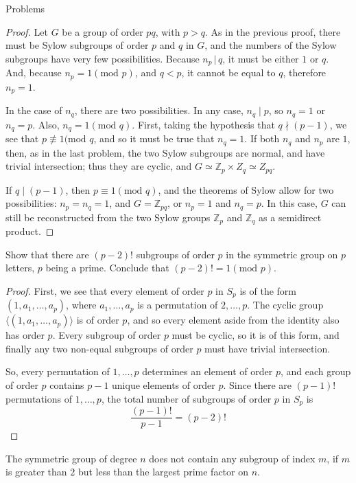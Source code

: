 \documentclass[12pt]{article}
\newcommand{\Z}{\mathbb{Z}}
\theoremstyle{definition}
\newenvironment{problem}[2][Problem]{\begin{trivlist}
\item[\hskip \labelsep {\bfseries #1}\hskip \labelsep {\bfseries #2.}]}{\end{trivlist}}
\begin{document}
\begin{section}{Problems}
\begin{problem}{5}
\begin{proof}
		Let $G$ be a group of order $pq$, with $p > q$. As in the previous proof, there must be Sylow subgroups of order $p$ and $q$ in $G$, and the numbers of the Sylow subgroups have very few possibilities. Because $n_p \,\lvert\, q$, it must be either $1$ or $q$. And, because $n_p = 1 (\text{mod }p)$, and $q < p$, it cannot be equal to $q$, therefore $n_p = 1$. 
		\par In the case of $n_q$, there are two possibilities. In any case, $n_q \mid p$, so $n_q = 1$ or $n_q = p$. Also, $n_q = 1 (\text{mod }q)$. First, taking the hypothesis that $q \nmid (p-1)$, we see that $p \not\equiv 1 (\text{mod }q$, and so it must be true that $n_q  = 1$. If both $n_q$ and $n_p$ are $1$, then, as in the last problem, the two Sylow subgroups are normal, and have trivial intersection; thus they are cyclic, and $G \simeq \Z_p \times Z_q \simeq Z_{pq}$.
		\par If $q \mid (p-1)$, then $p \equiv 1 (\text{mod }q)$, and the theorems of Sylow allow for two possibilities: $n_p = n_q = 1$, and $G = \Z_{pq}$, or $n_p = 1$ and $n_q = p$. In this case, $G$ can still be reconstructed from the two Sylow groups $\Z_p$ and $\Z_q$ as a semidirect product. 
	\end{proof}
\end{problem}
\begin{problem}{6}
	Show that there are $(p-2)!$ subgroups of order $p$ in the symmetric group on $p$ letters, $p$ being a prime. Conclude that $(p-2)! = 1 (\text{mod }p)$.
	\begin{proof}
	First, we see that every element of order $p$ in $S_p$ is of the form $(1, a_1, \dots, a_p)$, where $a_1, \dots, a_p$ is a permutation of $2, \dots, p$. The cyclic group $\langle (1, a_1, \dots, a_p) \rangle$ is of order $p$, and so every element aside from the identity also has order $p$. Every subgroup of order $p$ must be cyclic, so it is of this form, and finally any two non-equal subgroups of order $p$ must have trivial intersection.
	\par So, every permutation of $1, \dots, p$ determines an element of order $p$, and each group of order $p$ contains $p-1$ unique elements of order $p$. Since there are $(p-1)!$ permutations of $1, \dots, p$, the total number of subgroups of order $p$ in $S_p$ is
	\[
	\frac{(p-1)!}{p-1} = (p-2)!
	\]
	\end{proof}
\end{problem}
\begin{problem}{6.5}
	The symmetric group of degree $n$ does not contain any subgroup of index $m$, if $m$ is greater than $2$ but less than the largest prime factor on $n$.

\end{problem}
\end{section}
\end{document}

